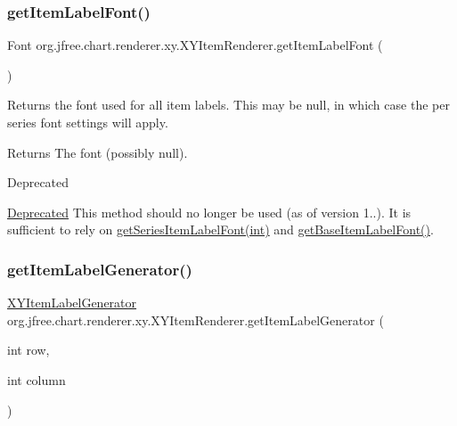 \subsubsection{\texorpdfstring{get\+Item\+Label\+Font()}{getItemLabelFont()}\hspace{0.1cm}{\footnotesize\ttfamily [2/2]}}
{\footnotesize\ttfamily Font org.\+jfree.\+chart.\+renderer.\+xy.\+X\+Y\+Item\+Renderer.\+get\+Item\+Label\+Font (\begin{DoxyParamCaption}{ }\end{DoxyParamCaption})}

Returns the font used for all item labels. This may be {\ttfamily null}, in which case the per series font settings will apply.

\begin{DoxyReturn}{Returns}
The font (possibly {\ttfamily null}).
\end{DoxyReturn}
\begin{DoxyRefDesc}{Deprecated}
\item[\mbox{\hyperlink{deprecated__deprecated000229}{Deprecated}}]This method should no longer be used (as of version 1..). It is sufficient to rely on \mbox{\hyperlink{interfaceorg_1_1jfree_1_1chart_1_1renderer_1_1xy_1_1_x_y_item_renderer_ab71c90261054a6698b53cb96970cca90}{get\+Series\+Item\+Label\+Font(int)}} and \mbox{\hyperlink{interfaceorg_1_1jfree_1_1chart_1_1renderer_1_1xy_1_1_x_y_item_renderer_a45bb73763c2f4ec4c212350abaf7a5b5}{get\+Base\+Item\+Label\+Font()}}. \end{DoxyRefDesc}
\mbox{\label{interfaceorg_1_1jfree_1_1chart_1_1renderer_1_1xy_1_1_x_y_item_renderer_a3d045954d83096495f635a1681567f8f}} 
\subsubsection{\texorpdfstring{get\+Item\+Label\+Generator()}{getItemLabelGenerator()}}
{\footnotesize\ttfamily \mbox{\hyperlink{interfaceorg_1_1jfree_1_1chart_1_1labels_1_1_x_y_item_label_generator}{X\+Y\+Item\+Label\+Generator}} org.\+jfree.\+chart.\+renderer.\+xy.\+X\+Y\+Item\+Renderer.\+get\+Item\+Label\+Generator (\begin{DoxyParamCaption}\item[{int}]{row,  }\item[{int}]{column }\end{DoxyParamCaption})}

